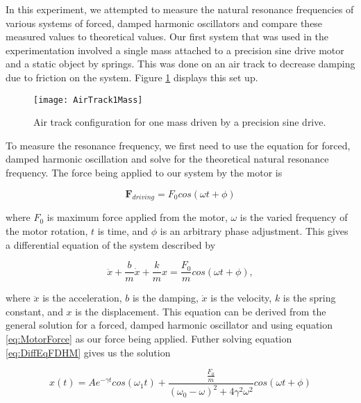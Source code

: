 \par In this experiment, we attempted to measure the natural resonance frequencies of various systems of forced, damped harmonic oscillators and compare these measured values to theoretical values. Our first system that was used in the experimentation involved a single mass attached to a precision sine drive motor and a static object by springs. This was done on an air track to decrease damping due to friction on the system. Figure \ref{figure:AirTrack1Mass} displays this set up.

\begin{figure}[h]
\centering
\texttt{[image: AirTrack1Mass]}
\caption{Air track configuration for one mass driven by a precision sine drive.}
\label{figure:AirTrack1Mass}
\end{figure}

\par To measure the resonance frequency, we first need to use the equation for forced, damped harmonic oscillation and solve for the theoretical natural resonance frequency. The force being applied to our system by the motor is

\begin{equation}
\textbf{F}_{driving} = F_0 cos(\omega t + \phi)
\label{eq:MotorForce}
\end{equation}

\noindent where $F_0$ is maximum force applied from the motor, $\omega$ is the varied frequency of the motor rotation, $t$ is time, and $\phi$ is an arbitrary phase adjustment. This gives a differential equation of the system described by

\begin{equation}
\ddot{x} + \frac{b}{m}\dot{x} + \frac{k}{m}x = \frac{F_0}{m} cos(\omega t + \phi) ,
\label{eq:DiffEqFDHM}
\end{equation}

\noindent where $\ddot{x}$ is the acceleration, $b$ is the damping, $\dot{x}$ is the velocity, $k$ is the spring constant, and $x$ is the displacement. This equation can be derived from the  general solution for a forced, damped harmonic oscillator and using equation \ref{eq:MotorForce} as our force being applied. Futher solving equation \ref{eq:DiffEqFDHM} gives us the solution

\begin{equation}
x(t) = Ae^{- \gamma t} cos( \omega_1 t) + \frac{\frac{F_0}{m}}{(\omega_0 - \omega)^2 + 4 \gamma^2 \omega^2} cos(\omega t + \phi)
\label{eq:solution1cart}
\end{equation}

